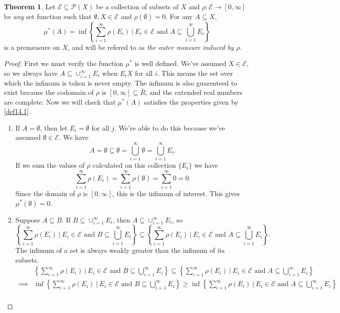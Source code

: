 \documentclass{article}
\theoremstyle{definition}
\newtheorem{theorem}{Theorem}[section]
\begin{document}
\begin{theorem}
	Let $\mathcal E\subseteq \mathcal P(X)$ be a collection of subsets of $X$ and $\rho:\mathcal E\to [0,\infty]$ be \textit{any} set function such that $\emptyset,X\in \mathcal E$ and $\rho(\emptyset)=0$. For any $A\subseteq X$, 
	$$\mu^*(A)=\inf\left\{\sum_{i=1}^\infty \rho(E_i)\ \biggr| \ E_i\in\mathcal E\text{ and }A\subseteq \bigcup_{i=1}^\infty E_i\right\}$$ is a premeasure on $X$, and will be refered to as \textit{\color{red}the outer measure induced by $\rho$.} 
\end{theorem}
\begin{proof}
	First we must verify the function $\mu^*$ is well defined. We've assumed $X\in\mathcal E$, so we always have $A\subseteq \cup_{i=1}^\infty E_i$ when $E_i X$ for all $i$. This means the set over which the infimum is taken is never empty. The infimum is also guarenteed to exist because the codomain of $\rho$ is $[0,\infty]\subseteq \bar R$, and the extended real numbers are complete. Now we will check that $\mu^*(A)$ satisfies the properties given by \cref{def14.1}.
	\begin{enumerate}
	\item If $A = \emptyset$, then let $E_i = \emptyset$ for all $j$. We're able to do this because we've assumed $\emptyset \in\mathcal E$. We have 
	$$ A = \emptyset \subseteq  \emptyset = \bigcup_{i=1}^\infty \emptyset = \bigcup_{i=1}^\infty E_i.$$ If we sum the values of $\rho$ calculated on this collection $\{E_i\}$ we have 
	$$ \sum_{i=1}^\infty \rho(E_i) = \sum_{i=1}^\infty \rho(\emptyset) = \sum_{i=1}^\infty 0 = 0 .$$ Since the domain of $\rho$ is $[0,\infty]$, this is the infimum of interest. This gives $\mu^*(\emptyset)=0$.
	\item Suppose $A\subseteq B$. If $B\subseteq \cup_{i=1}^\infty E_i$, then $A\subseteq \cup_{i=1}^\infty E_i$, so 
	$$ \left\{\sum_{i=1}^\infty \rho(E_i)\ \biggr| \ E_i\in\mathcal E\text{ and }B\subseteq \bigcup_{i=1}^\infty E_i\right\}\subseteq \left\{\sum_{i=1}^\infty \rho(E_i)\ \biggr| \ E_i\in\mathcal E\text{ and }A\subseteq \bigcup_{i=1}^\infty E_i\right\}.$$ The infimum of a set is always weakly greater than the infimum of its subsets. 
	\begin{align*}
		 &\left\{\sum_{i=1}^\infty \rho(E_i)\ \biggr| \ E_i\in\mathcal E\text{ and }B\subseteq \bigcup_{i=1}^\infty E_i\right\}\subseteq \left\{\sum_{i=1}^\infty \rho(E_i)\ \biggr| \ E_i\in\mathcal E\text{ and }A\subseteq \bigcup_{i=1}^\infty E_i\right\}\\
		 \implies &  \inf\left\{\sum_{i=1}^\infty \rho(E_i)\ \biggr| \ E_i\in\mathcal E\text{ and }B\subseteq \bigcup_{i=1}^\infty E_i\right\}\ge \inf\left\{\sum_{i=1}^\infty \rho(E_i)\ \biggr| \ E_i\in\mathcal E\text{ and }A\subseteq \bigcup_{i=1}^\infty E_i\right\}\\

\end{align*}
\end{enumerate}
\end{proof}
\end{document}
